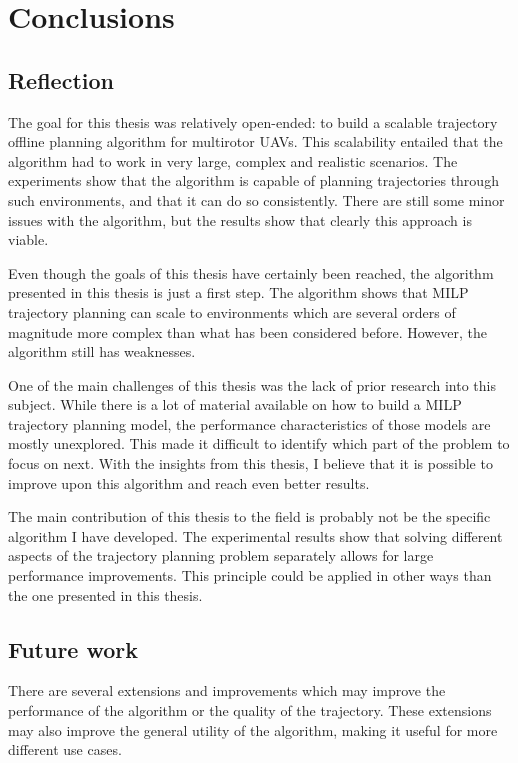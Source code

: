 

\chapter{Conclusions}
\label{section:conclusions}

\section{Reflection}
The goal for this thesis was relatively open-ended: to build a scalable trajectory offline planning algorithm for multirotor UAVs. This scalability entailed that the algorithm had to work in very large, complex and realistic scenarios. The experiments show that the algorithm is capable of planning trajectories through such environments, and that it can do so consistently. There are still some minor issues with the algorithm, but the results show that clearly this approach is viable.
\par
Even though the goals of this thesis have certainly been reached, the algorithm presented in this thesis is just a first step. The algorithm shows that MILP trajectory planning can scale to environments which are several orders of magnitude more complex than what has been considered before. However, the algorithm still has weaknesses.
\par
One of the main challenges of this thesis was the lack of prior research into this subject. While there is a lot of material available on how to build a MILP trajectory planning model, the performance characteristics of those models are mostly unexplored. This made it difficult to identify which part of the problem to focus on next. With the insights from this thesis, I believe that it is possible to improve upon this algorithm and reach even better results.
\par
The main contribution of this thesis to the field is probably not be the specific algorithm I have developed. The experimental results show that solving different aspects of the trajectory planning problem separately allows for large performance improvements. This principle could be applied in other ways than the one presented in this thesis.

\section{Future work}
\label{section:future}
There are several extensions and improvements which may improve the performance of the algorithm or the quality of the trajectory. These extensions may also improve the general utility of the algorithm, making it useful for more different use cases.

